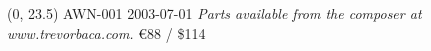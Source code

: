 \documentclass[10pt]{article}
\begin{document}
\begin{textblock}{23}(0, 23.5)
AWN-001 2003-07-01
\hfill \textit{Parts available from the composer at www.trevorbaca.com.}
\hfill \euro 88 / \$114
\end{textblock}
\end{document}
